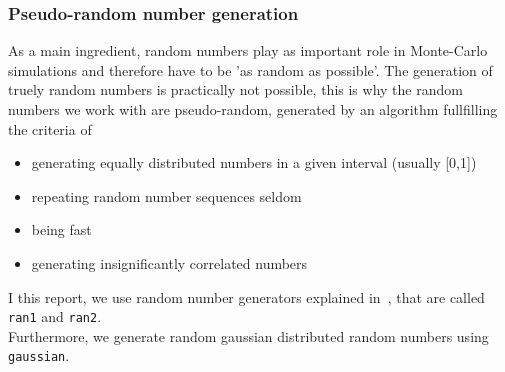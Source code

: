 \subsubsection{Pseudo-random number generation}\label{sec:ran}
As a main ingredient, random numbers play as important role in Monte-Carlo simulations and therefore have to be 'as random as possible'. The generation of truely random numbers is practically not possible, this is why the random numbers we work with are pseudo-random, generated by an algorithm fullfilling the criteria of
\begin{itemize}
\item generating equally distributed numbers in a given interval (usually [0,1])
\item repeating random number sequences seldom
\item being fast
\item generating insignificantly correlated numbers
\end{itemize}
I this report, we use random number generators explained in~\cite{numerical}, that are called \texttt{ran1} and \texttt{ran2}.\\
Furthermore, we generate random gaussian distributed random numbers using \texttt{gaussian}. 

